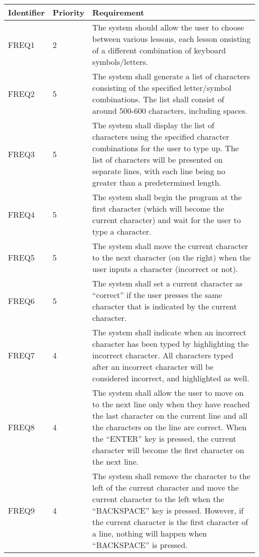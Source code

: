 \documentclass[12pt, titlepage]{article}
\begin{document}
\begin{center}
\begin{longtable}{ |m{2cm}|m{1.8cm}|m{9.4cm}| } 
    \hline
    \textbf{Identifier} & \textbf{Priority} & \textbf{Requirement} \\ 
    \hline
    FREQ1 & 2 & The system should allow the user to choose between various lessons, each lesson onsisting of a different combination of keyboard symbols/letters. \\ 
    \hline
    FREQ2 & 5 & The system shall generate a list of characters consisting of the specified letter/symbol combinations. The list shall consist of around 500-600 characters, including spaces. \\ 
    \hline
    FREQ3 & 5 & The system shall display the list of characters using the specified character combinations for the user to type up. The list of characters will be presented on separate lines, with each line being no greater than a predetermined length.  \\ 
    \hline
    FREQ4 & 5 & The system shall begin the program at the first character (which will become the current character) and wait for the user to type a character. \\ 
    \hline
    FREQ5 & 5 & The system shall move the current character to the next character (on the right) when the user inputs a character (incorrect or not).  \\ 
    \hline
    FREQ6 & 5 & The system shall set a current character as “correct” if the user presses the same character that is indicated by the current character. \\ 
    \hline
    FREQ7 & 4 & The system shall indicate when an incorrect character has been typed by highlighting the incorrect character. All characters typed after an incorrect character will be considered incorrect, and highlighted as well. \\ 
    \hline
    FREQ8 & 4 & The system shall allow the user to move on to the next line only when they have reached the last character on the current line and all the characters on the line are correct. When the “ENTER” key is pressed, the current character will become the first character on the next line. \\ 
    \hline
    FREQ9 & 4 & The system shall remove the character to the left of the current character and move the current character to the left when the “BACKSPACE” key is pressed. However, if the current character is the first character of a line, nothing will happen when “BACKSPACE” is pressed. \\ 

\end{longtable}
\end{center}
\end{document}
